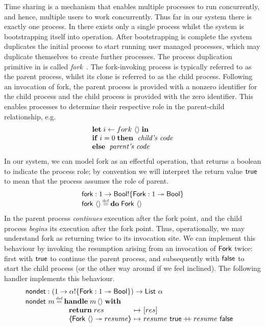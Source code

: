 \documentclass[12pt,phd,lfcs,twoside,openright,logo,leftchapter,normalheadings]{infthesis}
\theoremstyle{plain}
\theoremstyle{definition}
\begin{document}
Time sharing is a mechanism that enables multiple processes to run
concurrently, and hence, multiple users to work concurrently.
%
Thus far in our system there is exactly one process.
%
In \UNIX{} there exists only a single process whilst the system is
bootstrapping itself into operation. After bootstrapping is complete
the system duplicates the initial process to start running user
managed processes, which may duplicate themselves to create further
processes.
%
The process duplication primitive in \UNIX{} is called
\emph{fork}~\cite{RitchieT74}.
%
The fork-invoking process is typically referred to as the parent
process, whilst its clone is referred to as the child process.
%
Following an invocation of fork, the parent process is provided with a
nonzero identifier for the child process and the child process is
provided with the zero identifier. This enables processes to determine
their respective role in the parent-child relationship, e.g.
%
\[
  \bl
    \Let\;i\revto fork~\Unit\;\In\\
    \If\;i = 0\;\Then\;
    ~\textit{child's code}\\
    \Else\;~\textit{parent's code}
  \el
\]
%
In our system, we can model fork as an effectful operation, that
returns a boolean to indicate the process role; by convention we will
interpret the return value $\mathsf{true}$ to mean that the process assumes
the role of parent.
%
\[
  \bl
    \fork : \UnitType \to \Bool \eff \{\Fork : \UnitType \opto \Bool\}\\
    \fork~\Unit \defas \Do\;\Fork~\Unit
  \el
\]
%
In \UNIX{} the parent process \emph{continues} execution after the
fork point, and the child process \emph{begins} its execution after
the fork point.
%
Thus, operationally, we may understand fork as returning twice to its
invocation site. We can implement this behaviour by invoking the
resumption arising from an invocation of $\mathsf{Fork}$ twice: first with
$\mathsf{true}$ to continue the parent process, and subsequently with $\mathsf{false}$
to start the child process (or the other way around if we feel
inclined).
%
The following handler implements this behaviour.
%
\[
  \bl
    \nondet : (\UnitType \to \alpha \eff \{\Fork:\UnitType \opto \Bool\}) \to \List~\alpha\\
    \nondet~m \defas
         \ba[t]{@{}l}
           \Handle\;m\,\Unit\;\With\\
             ~\ba{@{~}l@{~}c@{~}l}
                \Return\;res &\mapsto& [res]\\
                \OpCase{\Fork}{\Unit}{resume} &\mapsto& resume~\True \concat resume~\False
              \ea
         \ea
  \el
\]
\end{document}
